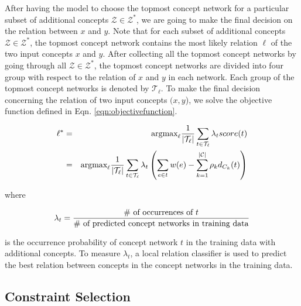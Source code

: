 After having the model to choose the topmost concept network for a
particular subset of additional concepts $\mathcal{Z} \in
\mathcal{Z}^*$, we are going to make the final decision on the
relation between $x$ and $y$. Note that for each subset of additional
concepts $\mathcal{Z} \in \mathcal{Z}^*$, the topmost concept network
contains the most likely relation $\ell$ of the two input concepts $x$
and $y$. After collecting all the topmost concept networks by going
through all $\mathcal{Z} \in \mathcal{Z}^*$, the topmost concept
networks are divided into four group with respect to the relation of
$x$ and $y$ in each network. Each group of the topmost concept
networks is denoted by $\mathcal{T}_{\ell}$. To make the final
decision concerning the relation of two input concepts $(x,y$), we
solve the objective function defined in
Eqn. \ref{eqn:objectivefunction}.

\begin{eqnarray}
\label{eqn:objectivefunction}
\ell^* & = & \text{argmax}_{\ell} \frac {1} {|\mathcal{T}_{\ell}|} \sum_{t \in \mathcal{T}_{\ell}} \lambda_{t} score(t) \\
& = & \text{argmax}_{\ell} \frac{1}{|\mathcal{T}_{\ell}|} \sum_{t \in \mathcal{T}_{\ell}} \lambda_{t} \left( \sum_{e \in t} w(e) - \sum_{k=1}^{|\mathcal{C}|} \rho_{k} d_{C_k}(t) \right) \notag
\end{eqnarray}

where 

\begin{equation}
  \lambda_t = \frac{\# \text{ of occurrences of }t}{\# \text{ of
      predicted concept networks in training data}} \notag
\end{equation}

is the occurrence probability of concept network $t$ in the training
data with additional concepts. To measure $\lambda_t$, a local
relation classifier is used to predict the best relation between
concepts in the concept networks in the training data.

\subsection{Constraint Selection}
\label{sec:constraintselection}

